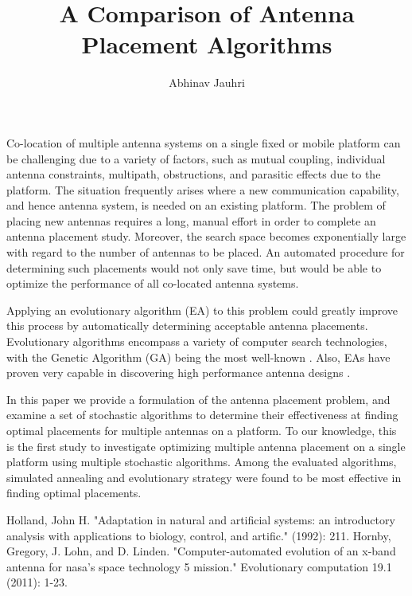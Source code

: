 \documentclass[12pt,a4paper]{article}
\begin{document}
%
\title{A Comparison of Antenna Placement Algorithms}
\author{Abhinav Jauhri}
%
\date{}
\maketitle
%
\abstract
Co-location of multiple antenna systems on a single fixed or mobile platform can be challenging due to a variety of factors, such as mutual coupling, individual antenna constraints, multipath, obstructions, and parasitic effects due to the platform. The situation frequently arises where a new communication capability, and hence antenna system, is needed on an existing platform. The problem of placing new antennas requires a long, manual effort in order to complete an antenna placement study. Moreover, the search space becomes exponentially large with regard to the number of antennas to be placed. An automated procedure for determining such placements would not only save time, but would be able to optimize the performance of all co-located antenna systems. 

Applying an evolutionary algorithm (EA) to this problem could greatly improve this process by automatically determining acceptable antenna placements. Evolutionary algorithms encompass a variety of computer search technologies, with the Genetic Algorithm (GA) being the most well-known \cite{holland1975adaptation}. Also, EAs have proven very capable in discovering high performance antenna designs \cite{lohn2005evolutionary}.

In this paper we provide a formulation of the antenna placement problem, and examine a set of stochastic algorithms to determine their effectiveness at finding optimal placements for multiple antennas on a platform. To our knowledge, this is the first study to investigate optimizing multiple antenna placement on a single platform using multiple stochastic algorithms. Among the evaluated algorithms, simulated annealing and evolutionary strategy were found to be most effective in finding optimal placements. 

\begin{thebibliography}{1}
Holland, John H. "Adaptation in natural and artificial systems: an introductory analysis with applications to biology, control, and artific." (1992): 211. 
Hornby, Gregory, J. Lohn, and D. Linden. "Computer-automated evolution of an x-band antenna for nasa's space technology 5 mission." Evolutionary computation 19.1 (2011): 1-23. 
\end{thebibliography}
\end{document}
